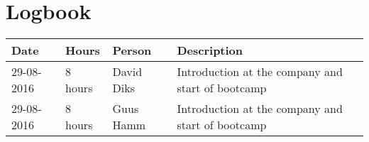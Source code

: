 \chapter{Logbook}
\begin{tabular}{|l|l|l|l|}
	\hline
	\textbf{Date} & \textbf{Hours} & \textbf{Person} & \textbf{Description} \\
	\hline
	29-08-2016 & 8 hours & David Diks & Introduction at the company and start of bootcamp \\ \hline
	29-08-2016 & 8 hours & Guus Hamm & Introduction at the company and start of bootcamp \\ \hline
\end{tabular}